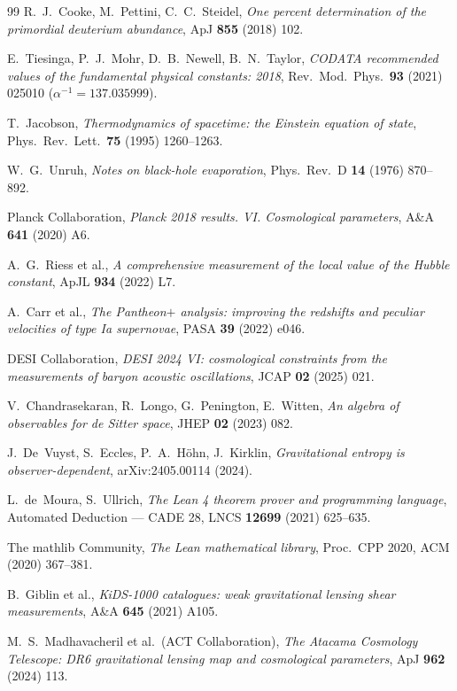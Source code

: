 \documentclass[11pt]{article}
\theoremstyle{definition}\newtheorem{deriv}{Derivation}
\begin{document}
\begin{thebibliography}{99}
 R.~J.~Cooke, M.~Pettini, C.~C.~Steidel, \emph{One percent determination of the primordial deuterium abundance}, ApJ \textbf{855} (2018) 102.

 E.~Tiesinga, P.~J.~Mohr, D.~B.~Newell, B.~N.~Taylor, \emph{CODATA recommended values of the fundamental physical constants: 2018}, Rev.\ Mod.\ Phys.\ \textbf{93} (2021) 025010 ($\alpha^{-1}=137.035999$).

 T.~Jacobson, \emph{Thermodynamics of spacetime: the Einstein equation of state}, Phys.\ Rev.\ Lett.\ \textbf{75} (1995) 1260--1263.

 W.~G.~Unruh, \emph{Notes on black-hole evaporation}, Phys.\ Rev.\ D \textbf{14} (1976) 870--892.

 Planck Collaboration, \emph{Planck 2018 results. VI. Cosmological parameters}, A\&A \textbf{641} (2020) A6.

 A.~G.~Riess et al., \emph{A comprehensive measurement of the local value of the Hubble constant}, ApJL \textbf{934} (2022) L7.

 A.~Carr et al., \emph{The Pantheon$+$ analysis: improving the redshifts and peculiar velocities of type Ia supernovae}, PASA \textbf{39} (2022) e046.

 DESI Collaboration, \emph{DESI 2024 VI: cosmological constraints from the measurements of baryon acoustic oscillations}, JCAP \textbf{02} (2025) 021.

 V.~Chandrasekaran, R.~Longo, G.~Penington, E.~Witten, \emph{An algebra of observables for de Sitter space}, JHEP \textbf{02} (2023) 082.

 J.~De~Vuyst, S.~Eccles, P.~A.~H\"ohn, J.~Kirklin, \emph{Gravitational entropy is observer-dependent}, arXiv:2405.00114 (2024).

 L.~de~Moura, S.~Ullrich, \emph{The Lean 4 theorem prover and programming language}, Automated Deduction --- CADE 28, LNCS \textbf{12699} (2021) 625--635.

 The mathlib Community, \emph{The Lean mathematical library}, Proc.\ CPP 2020, ACM (2020) 367--381.

 B.~Giblin et al., \emph{KiDS-1000 catalogues: weak gravitational lensing shear measurements}, A\&A \textbf{645} (2021) A105.

 M.~S.~Madhavacheril et al.\ (ACT Collaboration), \emph{The Atacama Cosmology Telescope: DR6 gravitational lensing map and cosmological parameters}, ApJ \textbf{962} (2024) 113.


\end{thebibliography}
\end{document}

